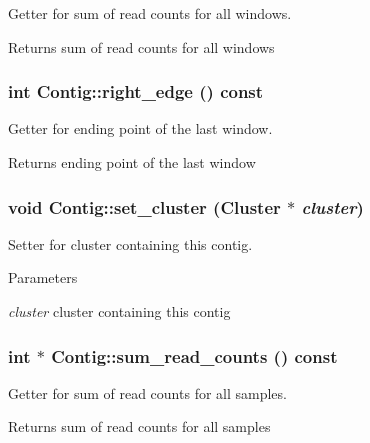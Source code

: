 Getter for sum of read counts for all windows. \begin{DoxyReturn}{Returns}
sum of read counts for all windows 
\end{DoxyReturn}
\hypertarget{classContig_afcc79b673b2e617997a2abbc543dbd05}{
\subsubsection[{right\_\-edge}]{\setlength{\rightskip}{0pt plus 5cm}int Contig::right\_\-edge () const}}
\label{classContig_afcc79b673b2e617997a2abbc543dbd05}


Getter for ending point of the last window. \begin{DoxyReturn}{Returns}
ending point of the last window 
\end{DoxyReturn}
\hypertarget{classContig_af3467f4ccb8e5db1eb86c96d40f38421}{
\subsubsection[{set\_\-cluster}]{\setlength{\rightskip}{0pt plus 5cm}void Contig::set\_\-cluster ({\bf Cluster} $\ast$ {\em cluster})}}
\label{classContig_af3467f4ccb8e5db1eb86c96d40f38421}


Setter for cluster containing this contig. 
\begin{DoxyParams}{Parameters}
\item[{\em cluster}]cluster containing this contig \end{DoxyParams}
\hypertarget{classContig_abaae9169895892b8f5f64d45ff9e83d2}{
\subsubsection[{sum\_\-read\_\-counts}]{\setlength{\rightskip}{0pt plus 5cm}int $\ast$ Contig::sum\_\-read\_\-counts () const}}
\label{classContig_abaae9169895892b8f5f64d45ff9e83d2}


Getter for sum of read counts for all samples. \begin{DoxyReturn}{Returns}
sum of read counts for all samples 
\end{DoxyReturn}


